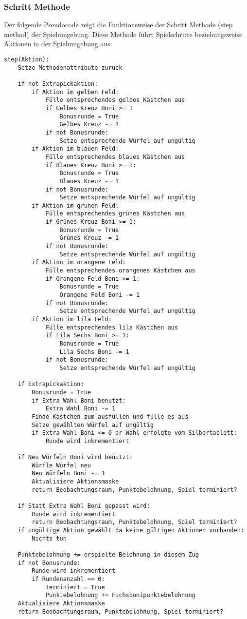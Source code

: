 \subsubsection{Schritt Methode}
Der folgende Pseudocode zeigt die Funktionsweise der Schritt Methode (step method) der Spielumgebung. Diese Methode führt Spielschritte beziehungsweise Aktionen in der Spielumgebung aus:
\vspace{0.5cm}
\begin{lstlisting}[caption={Schritt Methode}]
step(Aktion):
	Setze Methodenattribute zurück
	
	if not Extrapickaktion:
		if Aktion im gelben Feld:
			Fülle entsprechendes gelbes Kästchen aus
			if Gelbes Kreuz Boni >= 1
				Bonusrunde = True
				Gelbes Kreuz -= 1
			if not Bonusrunde:
				Setze entsprechende Würfel auf ungültig
		if Aktion im blauen Feld:
			Fülle entsprechendes blaues Kästchen aus
			if Blaues Kreuz Boni >= 1:
				Bonusrunde = True
				Blaues Kreuz -= 1
			if not Bonusrunde:
				Setze entsprechende Würfel auf ungültig
		if Aktion im grünen Feld:
			Fülle entsprechendes grünes Kästchen aus
			if Grünes Kreuz Boni >= 1:
				Bonusrunde = True
				Grünes Kreuz -= 1
			if not Bonusrunde:
				Setze entsprechende Würfel auf ungültig
		if Aktion im orangene Feld:
			Fülle entsprechendes orangenes Kästchen aus
			if Orangene Feld Boni >= 1:
				Bonusrunde = True
				Orangene Feld Boni -= 1
			if not Bonusrunde:
				Setze entsprechende Würfel auf ungültig
		if Aktion im lila Feld:
			Fülle entsprechendes lila Kästchen aus
			if Lila Sechs Boni >= 1:
				Bonusrunde = True
				Lila Sechs Boni -= 1
			if not Bonusrunde:
				Setze entsprechende Würfel auf ungültig
	
	if Extrapickaktion:
		Bonusrunde = True
		if Extra Wahl Boni benutzt:
			Extra Wahl Boni -= 1
		Finde Kästchen zum ausfüllen und fülle es aus
		Setze gewählten Würfel auf ungültig
		if Extra Wahl Boni <= 0 or Wahl erfolgte vom Silbertablett:
			Runde wird inkrementiert
			
	if Neu Würfeln Boni wird benutzt:
		Würfle Würfel neu
		Neu Würfeln Boni -= 1
		Aktualisiere Aktionsmaske
		return Beobachtungsraum, Punktebelohnung, Spiel terminiert?
		
	if Statt Extra Wahl Boni gepasst wird:
		Runde wird inkrementiert
		return Beobachtungsraum, Punktebelohnung, Spiel terminiert?
	if ungültige Aktion gewählt da keine gültigen Aktionen vorhanden:
		Nichts tun
			
	Punktebelohnung += erspielte Belohnung in diesem Zug
	if not Bonusrunde:
		Runde wird inkrementiert
		if Rundenanzahl == 0:
			terminiert = True
			Punktebelohnung += Fuchsbonipunktebelohnung
	Aktualisiere Aktionsmaske
	return Beobachtungsraum, Punktebelohnung, Spiel terminiert?		
\end{lstlisting}
